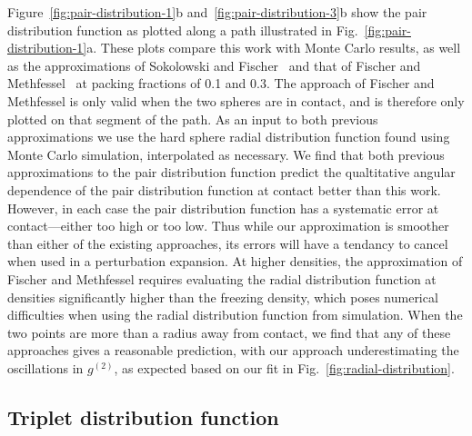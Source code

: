 \documentclass[letterpaper,twocolumn,amsmath,amssymb,pre,aps,10pt]{revtex4-1}
\begin{document}
Figure~\ref{fig:pair-distribution-1}b
and~\ref{fig:pair-distribution-3}b show the pair distribution function
as plotted along a path illustrated in
Fig.~\ref{fig:pair-distribution-1}a.  These plots compare this work
with Monte Carlo results, as well as the approximations of Sokolowski
and Fischer~\cite{sokolowski1992role} and that of Fischer and
Methfessel~\cite{fischer1980born} at packing fractions of 0.1 and 0.3.
The approach of Fischer and Methfessel is only valid when the two
spheres are in contact, and is therefore only plotted on that segment
of the path.  As an input to both previous approximations we use the
hard sphere radial distribution function found using Monte Carlo
simulation, interpolated as necessary.  We find that both previous
approximations to the pair distribution function predict the
qualtitative angular dependence of the pair distribution function at
contact better than this work.  However, in each case the pair
distribution function has a systematic error at contact---either too
high or too low.  Thus while our approximation is smoother than either
of the existing approaches, its errors will have a tendancy to cancel
when used in a perturbation expansion.  At higher densities, the
approximation of Fischer and Methfessel requires evaluating the radial
distribution function at densities significantly higher than the
freezing density, which poses numerical difficulties when using the
radial distribution function from simulation.  When the two points are
more than a radius away from contact, we find that any of these
approaches gives a reasonable prediction, with our approach
underestimating the oscillations in $g^(2)$, as expected based on our
fit in Fig.~\ref{fig:radial-distribution}.

\subsection{Triplet distribution function}
\end{document}
